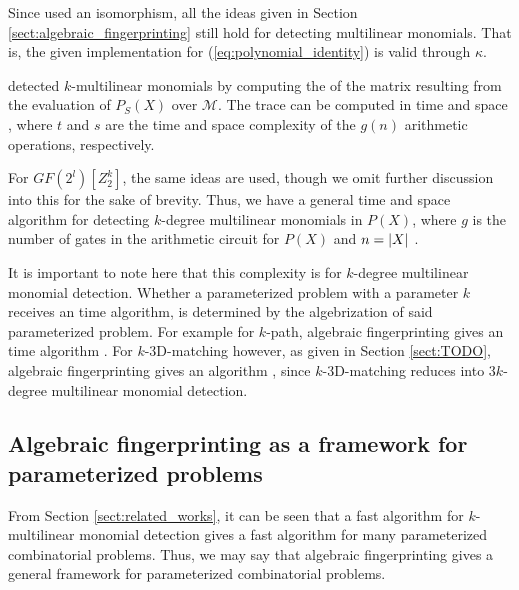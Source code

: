 Since \citeauthor{Koutis08} 
used an isomorphism, all the ideas given in 
Section \ref{sect:algebraic_fingerprinting} still hold for 
detecting multilinear monomials. That is, 
the given implementation for (\ref{eq:polynomial_identity}) is valid through $\kappa$.

\citeauthor{Koutis08} \cite{Koutis08} detected $k$-multilinear monomials 
by computing the  of the matrix resulting 
from the evaluation of $P_S(X)$ over $\mathcal{M}$. The trace can be computed 
in time  and space , where $t$ and $s$ are the time 
and space complexity of the $g(n)$ arithmetic operations, respectively. 

For $GF(2^{l})[Z_2^k]$, the same ideas are used, though we omit 
further discussion into this for the sake of brevity. 
Thus, we have a general 
 time and  space algorithm for detecting 
$k$-degree multilinear monomials in $P(X)$, where $g$ is the number of gates in the 
arithmetic circuit for $P(X)$ and $n = {\left\vert X\right\vert}$ \cite{KouWil09}.

It is important to note here that this complexity is for $k$-degree 
multilinear monomial detection. Whether a parameterized problem with a parameter 
$k$ receives an  time algorithm, is determined by the algebrization 
of said parameterized problem. 
For example for $k$-path, algebraic fingerprinting gives an  
time algorithm \cite{Williams09}. 
For $k$-3D-matching however, as given in Section \ref{sect:TODO}, 
algebraic fingerprinting gives an  algorithm \cite{KouWil15}, since 
$k$-3D-matching reduces into $3k$-degree multilinear monomial detection.



\subsection{Algebraic fingerprinting as a framework for parameterized problems}
\label{sect:algebraic_framework}

From Section \ref{sect:related_works}, 
it can be seen  
that a fast algorithm for $k$-multilinear monomial detection gives a 
fast algorithm for many parameterized combinatorial problems. Thus, we 
may say that algebraic fingerprinting gives a general framework for 
parameterized combinatorial problems. 

